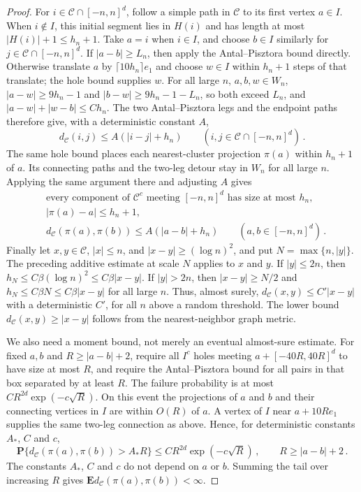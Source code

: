 \documentclass[12pt]{amsart}
\begin{document}
\begin{proof}
For $i\in\mathcal C\cap[-n,n]^d$, follow a simple path in $\mathcal C$ to its first vertex $a\in I$. When $i\notin I$, this initial segment lies in $H(i)$ and has length at most $|H(i)|+1\leq h_n+1$. Take $a=i$ when $i\in I$, and choose $b\in I$ similarly for $j\in\mathcal C\cap[-n,n]^d$. If $|a-b|\geq L_n$, then apply the Antal--Pisztora bound directly. Otherwise translate $a$ by $\lceil10h_n\rceil e_1$ and choose $w\in I$ within $h_n+1$ steps of that translate; the hole bound supplies $w$. For all large $n$, $a,b,w\in W_n$, $|a-w|\geq9h_n-1$ and $|b-w|\geq9h_n-1-L_n$, so both exceed $L_n$, and $|a-w|+|w-b|\leq Ch_n$. The two Antal--Pisztora legs and the endpoint paths therefore give, with a deterministic constant $A$,
\begin{equation*}
 d_{\mathcal C}(i,j)\leq A(|i-j|+h_n)
 \qquad(i,j\in\mathcal C\cap[-n,n]^d)\,.
\end{equation*}
The same hole bound places each nearest-cluster projection $\pi(a)$ within $h_n+1$ of $a$. Its connecting paths and the two-leg detour stay in $W_n$ for all large $n$. Applying the same argument there and adjusting $A$ gives
\begin{equation*}
 \begin{split}
 &\text{every component of }\mathcal C^c\text{ meeting }[-n,n]^d
       \text{ has size at most }h_n,\\
 &|\pi(a)-a|\leq h_n+1,\\
 &d_{\mathcal C}(\pi(a),\pi(b))\leq A(|a-b|+h_n)
       \qquad(a,b\in[-n,n]^d)\,.
 \end{split}
\end{equation*}
Finally let $x,y\in\mathcal C$, $|x|\leq n$, and $|x-y|\geq(\log n)^2$, and put $N=\max\{n,|y|\}$. The preceding additive estimate at scale $N$ applies to $x$ and $y$. If $|y|\leq2n$, then $h_N\leq C\beta(\log n)^2\leq C\beta|x-y|$. If $|y|>2n$, then $|x-y|\geq N/2$ and $h_N\leq C\beta N\leq C\beta|x-y|$ for all large $n$. Thus, almost surely, $d_{\mathcal C}(x,y)\leq C'|x-y|$ with a deterministic $C'$, for all $n$ above a random threshold. The lower bound $d_{\mathcal C}(x,y)\geq|x-y|$ follows from the nearest-neighbor graph metric.

We also need a moment bound, not merely an eventual almost-sure estimate. For fixed $a,b$ and $R\geq|a-b|+2$, require all $I^c$ holes meeting $a+[-40R,40R]^d$ to have size at most $R$, and require the Antal--Pisztora bound for all pairs in that box separated by at least $R$. The failure probability is at most $CR^{2d}\exp(-c\sqrt R)$. On this event the projections of $a$ and $b$ and their connecting vertices in $I$ are within $O(R)$ of $a$. A vertex of $I$ near $a+10Re_1$ supplies the same two-leg connection as above. Hence, for deterministic constants $A_*$, $C$ and $c$,
\begin{equation*}
 \mathbf P\{d_{\mathcal C}(\pi(a),\pi(b))>A_*R\}
 \leq CR^{2d}\exp(-c\sqrt R)\,,
 \qquad R\geq|a-b|+2\,.
\end{equation*}
The constants $A_*$, $C$ and $c$ do not depend on $a$ or $b$. Summing the tail over increasing $R$ gives $\mathbf E d_{\mathcal C}(\pi(a),\pi(b))<\infty$.


\end{proof}
\end{document}
